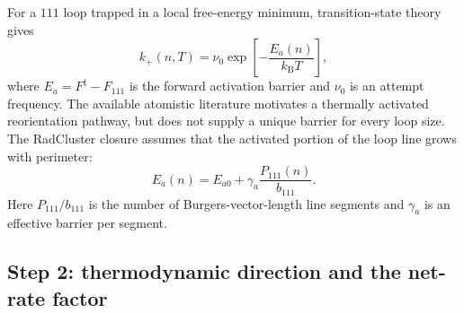 \documentclass[11pt,a4paper]{article}
\newcommand{\kb}{k_{\mathrm B}}
\newcommand{\rc}{\textsf{RadCluster}}
\begin{document}
For a $111$ loop trapped in a local free-energy minimum, transition-state theory
gives
\begin{equation}
 k_+(n,T)=\nu_0\exp\!\left[-\frac{E_a(n)}{\kb T}\right],              \label{eq:kplus}
\end{equation}
where $E_a=F^\ddagger-F_{111}$ is the forward activation barrier and $\nu_0$
is an attempt frequency.  The available atomistic literature motivates a
thermally activated reorientation pathway, but does not supply a unique barrier
for every loop size.  The \rc{} closure assumes that the activated portion of
the loop line grows with perimeter:
\begin{equation}
 E_a(n)=E_{a0}+\gamma_a\frac{P_{111}(n)}{b_{111}}.                     \label{eq:Ea}
\end{equation}
Here $P_{111}/b_{111}$ is the number of Burgers-vector-length line segments and
$\gamma_a$ is an effective barrier per segment.

\subsection{Step 2: thermodynamic direction and the net-rate factor}
\end{document}
